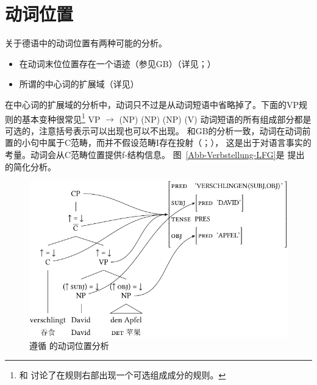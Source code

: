 \section{动词位置}
\label{Abschnitt-Verbstellung-LFG}

关于德语中的动词位置有两种可能的分析。
\begin{sloppypar}
\begin{itemize}
\item 在动词末位位置存在一个语迹（参见GB\indexgbc）（详见\citealp{Choi99a-u}；\citealp[\S~2.1.4]{Berman96a-u}） 
\item 所谓的中心词的扩展域（详见\citealp{Berman2003a}）
\end{itemize}
\end{sloppypar}

\noindent
在中心词的扩展域的分析中，动词只不过是从动词短语中省略掉了。下面的VP规则的基本变种很常见\footnote{%
 \citet[]{Bresnan2001a}和 \citet[]{Dalrymple2006a}讨论了在规则右部出现一个可选组成成分的规则。
}
\ea
\label{Regel-LFG-VP-alles-optional}
VP $\to$ (NP) (NP) (NP) (V)
\z
动词短语的所有组成部分都是可选的，注意括号表示可以出现也可以不出现。
和GB的分析一致，动词在动词前置的小句中属于C范畴，而并不假设范畴I存在投射（\citealp{Haider93a,Haider95b-u,Haider97a}；\citealp[\S~IV.3]{Sternefeld2006a-u}），
这是出于对语言事实的考量\citep[\S~3.2.2]{Berman2003a}。动词会从C范畴位置提供f-结构信息。
图~\vref{Abb-Verbstellung-LFG}是 \citet[]{Berman2003a}提出的简化分析。
 
\begin{figure}
\centerline{%
\includegraphics{Figures/verschlingt-david-den-apfel-lfg-lsp-crop}
}
\caption{\label{Abb-Verbstellung-LFG}遵循 \citet[]{Berman2003a}的动词位置分析}
\end{figure}%

